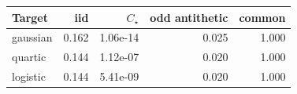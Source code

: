 \begin{tabular}{lrrrr}
\toprule
Target & iid & $C_\star$ & odd antithetic & common \\
\midrule
gaussian & 0.162 & 1.06e-14 & 0.025 & 1.000 \\
quartic & 0.144 & 1.12e-07 & 0.020 & 1.000 \\
logistic & 0.144 & 5.41e-09 & 0.020 & 1.000 \\
\bottomrule
\end{tabular}
